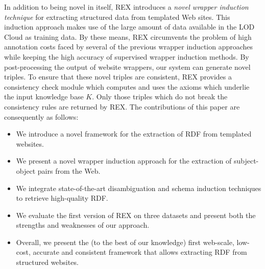 In addition to being novel in itself, REX introduces a \emph{novel wrapper induction technique} for extracting structured data from templated Web sites. 
This induction approach makes use of the large amount of data available in the LOD Cloud as training data. 
By these means, REX circumvents the problem of high annotation costs faced by several of the previous wrapper induction approaches~\cite{Hogue:2005:TAU:1060745.1060762,flesca2004web} while keeping the high accuracy of supervised wrapper induction methods. 
By post-processing the output of website wrappers, our system can generate novel triples. 
To ensure that these novel triples are consistent, REX provides a consistency check module which computes and uses the axioms which underlie the input knowledge base $K$. 
Only those triples which do not break the consistency rules are returned by REX. 
The contributions of this paper are consequently as follows:
\begin{itemize}
\item We introduce a novel framework for the extraction of RDF from templated websites.
\item We present a novel wrapper induction approach for the extraction of subject-object pairs from the Web.
\item We integrate state-of-the-art disambiguation and schema induction techniques to retrieve high-quality RDF. 
\item We evaluate the first version of REX on three datasets and present both the strengths and weaknesses of our approach.
\item Overall, we present the (to the best of our knowledge) first web-scale, low-cost, accurate and consistent framework that allows extracting RDF from structured websites.
\end{itemize}

